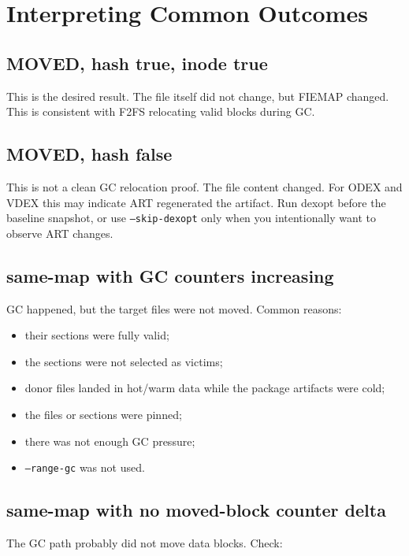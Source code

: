 \documentclass[11pt]{article}
\begin{document}
\section{Interpreting Common Outcomes}

\subsection{MOVED, hash true, inode true}

This is the desired result.  The file itself did not change, but FIEMAP changed.
This is consistent with F2FS relocating valid blocks during GC.

\subsection{MOVED, hash false}

This is not a clean GC relocation proof.  The file content changed.  For ODEX
and VDEX this may indicate ART regenerated the artifact.  Run dexopt before the
baseline snapshot, or use \texttt{--skip-dexopt} only when you intentionally
want to observe ART changes.

\subsection{same-map with GC counters increasing}

GC happened, but the target files were not moved.  Common reasons:

\begin{itemize}[nosep]
\item their sections were fully valid;
\item the sections were not selected as victims;
\item donor files landed in hot/warm data while the package artifacts were cold;
\item the files or sections were pinned;
\item there was not enough GC pressure;
\item \texttt{--range-gc} was not used.
\end{itemize}

\subsection{same-map with no moved-block counter delta}

The GC path probably did not move data blocks.  Check:
\end{document}
